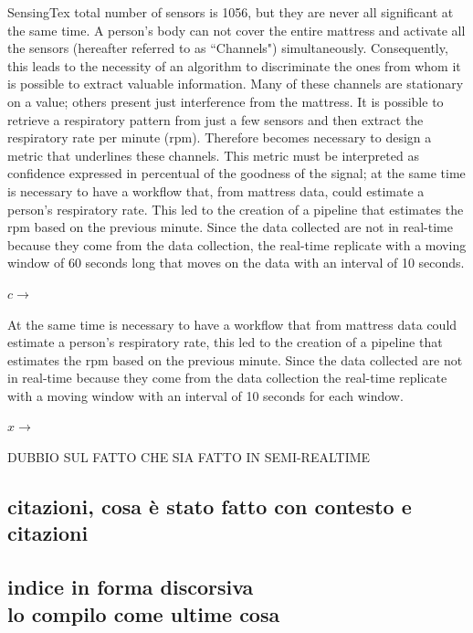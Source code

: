 SensingTex total number of sensors is 1056, but they are never all significant at the same time. A person's body can not cover the entire mattress and activate all the sensors (hereafter referred to as ``Channels") simultaneously. Consequently, this leads to the necessity of an algorithm to discriminate the ones from whom it is possible to extract valuable information.
Many of these channels are stationary on a value; others present just interference from the mattress. It is possible to retrieve a respiratory pattern from just a few sensors and then extract the respiratory rate per minute (rpm). Therefore becomes necessary to design a metric that underlines these channels. 
This metric must be interpreted as confidence expressed in percentual of the goodness of the signal; at the same time is necessary to have a workflow that, from mattress data, could estimate a person's respiratory rate. This led to the creation of a pipeline that estimates the rpm based on the previous minute. Since the data collected are not in real-time because they come from the data collection, the real-time replicate with a moving window of 60 seconds long that moves on the data with an interval of 10 seconds.




$ c\longrightarrow$ 

At the same time is necessary to have a workflow that from mattress data could estimate a person's respiratory rate, this led to the creation of a pipeline that estimates the rpm based on the previous minute. Since the data collected are not in real-time because they come from the data collection the real-time replicate with a moving window with an interval of 10 seconds for each window.


$ x\longrightarrow$ 





DUBBIO SUL FATTO CHE SIA FATTO IN SEMI-REALTIME

\subsection*{citazioni, cosa è stato fatto con contesto e citazioni}





\subsection*{indice in forma discorsiva \\ lo compilo come ultime cosa}

